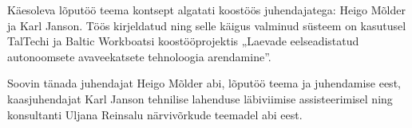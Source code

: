 Käesoleva lõputöö teema kontsept algatati koostöös juhendajatega: Heigo Mõlder ja Karl Janson. Töös kirjeldatud ning selle käigus valminud süsteem on kasutusel TalTechi ja Baltic Workboatsi koostööprojektis „Laevade eelseadistatud autonoomsete avaveekatsete tehnoloogia arendamine''.

Soovin tänada juhendajat Heigo Mõlder abi, lõputöö teema ja juhendamise eest, kaasjuhendajat Karl Janson tehnilise lahenduse läbiviimise assisteerimisel ning konsultanti Uljana Reinsalu närvivõrkude teemadel abi eest.
